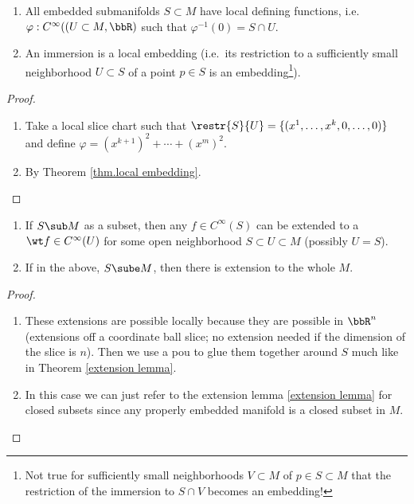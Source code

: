 \begin{prop}
\begin{enumerate}
    \item All embedded submanifolds $S\subset M$ have local defining functions, i.e.\ $\varphi:C^\infty((U\subset M, \bbR )$ such that $\varphi^{-1}(0)=S\cap U$.
    \item An immersion is a local embedding (i.e.\ its restriction to a sufficiently small neighborhood $U\subset S$ of a point $p\in S$ is an embedding\footnote{Not true for sufficiently small neighborhoods $V\subset M$ of $p\in S\subset M$ that the restriction of the immersion to $S\cap V$ becomes an embedding!}).
\end{enumerate}
\end{prop}
\begin{proof}
\begin{enumerate}
    \item Take a local slice chart such that $\restr{S}{U}=\{(x^1,\ldots,x^k,0,\ldots,0)\}$ and define $\varphi=(x^{k+1})^2+\cdots+(x^m)^2$.
    \item By Theorem \ref{thm.local embedding}.
\end{enumerate}
\end{proof}

\begin{thm}
\begin{enumerate}
    \item If $S\sub M$ as a subset, then any $f\in C^\infty(S)$ can be extended to a $\wt f\in C^\infty(U)$ for some open neighborhood $S\subset U\subset M$ (possibly $U=S$).
    \item If in the above, $S\sube M$, then there is extension to the whole $M$.
\end{enumerate}
\end{thm}
\begin{proof}
\begin{enumerate}
    \item These extensions are possible locally because they are possible in $\bbR^n$ (extensions off a coordinate ball slice; no extension needed if the dimension of the slice is $n$). Then we use a \gls{pou} to glue them together around $S$ much like in Theorem \ref{extension lemma}.
    \item In this case we can just refer to the extension lemma \ref{extension lemma} for closed subsets since any properly embedded manifold is a closed subset in $M$.
\end{enumerate}
\end{proof}

